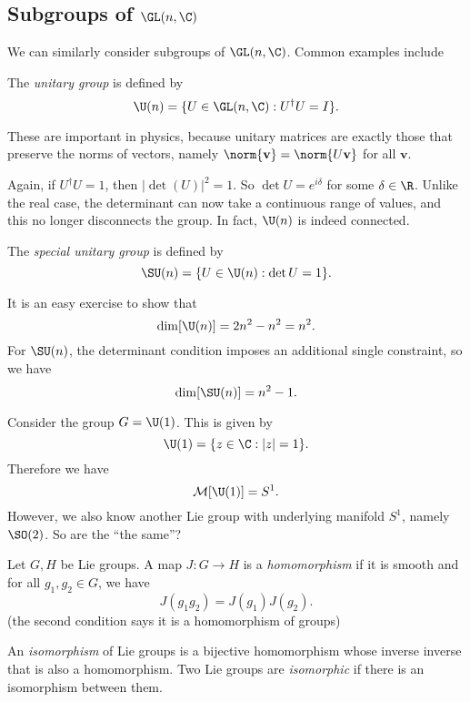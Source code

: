\documentclass[a4paper]{article}
\begin{document}
\subsection{Subgroups of \texorpdfstring{$\GL(n, \C)$}{GL(n, C)}}
We can similarly consider subgroups of $\GL(n, \C)$. Common examples include
\begin{defi}
  The \emph{unitary group} is defined by
  \[
    \U(n) = \{U \in \GL(n, \C): U^\dagger U = I\}.
  \]
\end{defi}
These are important in physics, because unitary matrices are exactly those that preserve the norms of vectors, namely $\norm{\mathbf{v}} = \norm{U\mathbf{v}}$ for all $\mathbf{v}$.

Again, if $U^\dagger U = 1$, then $|\det(U)|^2 = 1$. So $\det U = e^{i\delta}$ for some $\delta \in \R$. Unlike the real case, the determinant can now take a continuous range of values, and this no longer disconnects the group. In fact, $\U(n)$ is indeed connected.

\begin{defi}
  The \emph{special unitary group} is defined by
  \[
    \SU(n) = \{U \in \U(n): \det U = 1\}.
  \]
\end{defi}

It is an easy exercise to show that
\[
  \dim[\U(n)] = 2n^2 - n^2 = n^2.
\]
For $\SU(n)$, the determinant condition imposes an additional single constraint, so we have
\[
  \dim[\SU(n)] = n^2 - 1.
\]
\begin{eg}
  Consider the group $G = \U(1)$. This is given by
  \[
    \U(1) = \{z \in \C: |z| = 1\}.
  \]
  Therefore we have
  \[
    \mathcal{M}[\U(1)] = S^1.
  \]
  However, we also know another Lie group with underlying manifold $S^1$, namely $\SO(2)$. So are the ``the same''?
\end{eg}

\begin{defi}
  Let $G, H$ be Lie groups. A map $J: G \to H$ is a \emph{homomorphism} if it is smooth and for all $g_1, g_2 \in G$, we have
  \[
    J(g_1 g_2) = J(g_1) J(g_2).
  \]
  (the second condition says it is a homomorphism of groups)
\end{defi}

\begin{defi}
  An \emph{isomorphism} of Lie groups is a bijective homomorphism whose inverse inverse that is also a homomorphism. Two Lie groups are \emph{isomorphic} if there is an isomorphism between them.
\end{defi}
\end{document}
